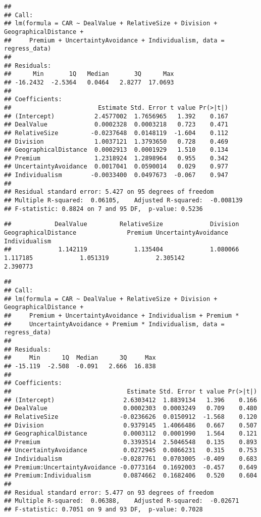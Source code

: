 \documentclass[]{article}
\begin{document}
\begin{verbatim}
## 
## Call:
## lm(formula = CAR ~ DealValue + RelativeSize + Division + GeographicalDistance + 
##     Premium + UncertaintyAvoidance + Individualism, data = regress_data)
## 
## Residuals:
##      Min       1Q   Median       3Q      Max 
## -16.2432  -2.5364   0.0464   2.8277  17.0693 
## 
## Coefficients:
##                        Estimate Std. Error t value Pr(>|t|)
## (Intercept)           2.4577002  1.7656965   1.392    0.167
## DealValue             0.0002328  0.0003218   0.723    0.471
## RelativeSize         -0.0237648  0.0148119  -1.604    0.112
## Division              1.0037121  1.3793650   0.728    0.469
## GeographicalDistance  0.0002913  0.0001929   1.510    0.134
## Premium               1.2318924  1.2898964   0.955    0.342
## UncertaintyAvoidance  0.0017041  0.0590014   0.029    0.977
## Individualism        -0.0033400  0.0497673  -0.067    0.947
## 
## Residual standard error: 5.427 on 95 degrees of freedom
## Multiple R-squared:  0.06105,    Adjusted R-squared:  -0.008139 
## F-statistic: 0.8824 on 7 and 95 DF,  p-value: 0.5236
\end{verbatim}

\begin{verbatim}
##            DealValue         RelativeSize             Division GeographicalDistance              Premium UncertaintyAvoidance        Individualism 
##             1.142119             1.135404             1.080066             1.117185             1.051319             2.305142             2.390773
\end{verbatim}

\begin{verbatim}
## 
## Call:
## lm(formula = CAR ~ DealValue + RelativeSize + Division + GeographicalDistance + 
##     Premium + UncertaintyAvoidance + Individualism + Premium * 
##     UncertaintyAvoidance + Premium * Individualism, data = regress_data)
## 
## Residuals:
##     Min      1Q  Median      3Q     Max 
## -15.119  -2.508  -0.091   2.666  16.838 
## 
## Coefficients:
##                                Estimate Std. Error t value Pr(>|t|)
## (Intercept)                   2.6303412  1.8839134   1.396    0.166
## DealValue                     0.0002303  0.0003249   0.709    0.480
## RelativeSize                 -0.0236626  0.0150912  -1.568    0.120
## Division                      0.9379145  1.4066486   0.667    0.507
## GeographicalDistance          0.0003112  0.0001990   1.564    0.121
## Premium                       0.3393514  2.5046548   0.135    0.893
## UncertaintyAvoidance          0.0272945  0.0866231   0.315    0.753
## Individualism                -0.0287761  0.0703005  -0.409    0.683
## Premium:UncertaintyAvoidance -0.0773164  0.1692003  -0.457    0.649
## Premium:Individualism         0.0874662  0.1682406   0.520    0.604
## 
## Residual standard error: 5.477 on 93 degrees of freedom
## Multiple R-squared:  0.06388,    Adjusted R-squared:  -0.02671 
## F-statistic: 0.7051 on 9 and 93 DF,  p-value: 0.7028
\end{verbatim}
\end{document}
